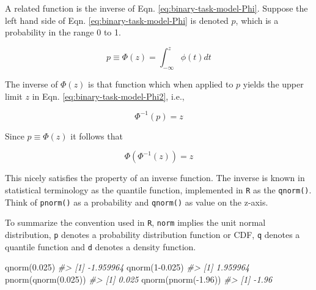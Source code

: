 \documentclass[
]{book}
\newenvironment{Shaded}{\begin{snugshade}}{\end{snugshade}}
\newcommand{\CommentTok}[1]{\textcolor[rgb]{0.56,0.35,0.01}{\textit{#1}}}
\newcommand{\DecValTok}[1]{\textcolor[rgb]{0.00,0.00,0.81}{#1}}
\newcommand{\FloatTok}[1]{\textcolor[rgb]{0.00,0.00,0.81}{#1}}
\newcommand{\FunctionTok}[1]{\textcolor[rgb]{0.00,0.00,0.00}{#1}}
\newcommand{\NormalTok}[1]{#1}
\newcommand{\SpecialCharTok}[1]{\textcolor[rgb]{0.00,0.00,0.00}{#1}}
\begin{document}
A related function is the inverse of Eqn. \eqref{eq:binary-task-model-Phi}. Suppose the left hand side of Eqn. \eqref{eq:binary-task-model-Phi} is denoted \(p\), which is a probability in the range 0 to 1.

\begin{equation} 
p \equiv \Phi\left ( z \right )=\int_{-\infty }^{z}\phi(t)dt
\label{eq:binary-task-model-Phi2}
\end{equation}

The inverse of \(\Phi(z)\) is that function which when applied to \(p\) yields the upper limit \(z\) in Eqn. \eqref{eq:binary-task-model-Phi2}, i.e.,

\begin{equation} 
\Phi^{-1}(p) = z
\label{eq:binary-task-model-PhiInvDef}
\end{equation}

Since \(p \equiv \Phi(z)\) it follows that

\begin{equation} 
\Phi(\Phi^{-1}(z))=z
\label{eq:binary-task-model-PhiInvDef2}
\end{equation}

This nicely satisfies the property of an inverse function. The inverse is known in statistical terminology as the quantile function, implemented in \texttt{R} as the \texttt{qnorm()}. Think of \texttt{pnorm()} as a probability and \texttt{qnorm()} as value on the z-axis.

To summarize the convention used in \texttt{R}, \texttt{norm} implies the unit normal distribution, \texttt{p} denotes a probability distribution function or CDF, \texttt{q} denotes a quantile function and \texttt{d} denotes a density function.

\begin{Shaded}
\begin{Highlighting}[numbers=left,,]
\FunctionTok{qnorm}\NormalTok{(}\FloatTok{0.025}\NormalTok{)}
\CommentTok{\#\textgreater{} [1] {-}1.959964}
\FunctionTok{qnorm}\NormalTok{(}\DecValTok{1}\FloatTok{{-}0.025}\NormalTok{)}
\CommentTok{\#\textgreater{} [1] 1.959964}
\FunctionTok{pnorm}\NormalTok{(}\FunctionTok{qnorm}\NormalTok{(}\FloatTok{0.025}\NormalTok{))}
\CommentTok{\#\textgreater{} [1] 0.025}
\FunctionTok{qnorm}\NormalTok{(}\FunctionTok{pnorm}\NormalTok{(}\SpecialCharTok{{-}}\FloatTok{1.96}\NormalTok{))}
\CommentTok{\#\textgreater{} [1] {-}1.96}
\end{Highlighting}
\end{Shaded}
\end{document}

